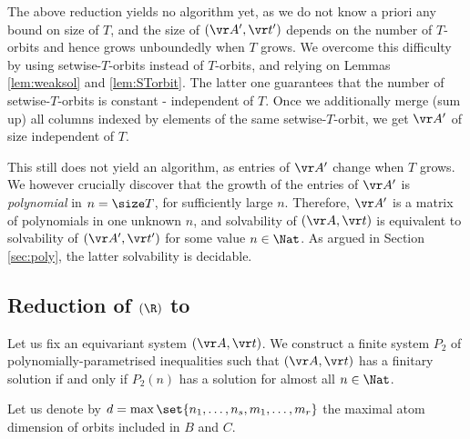 The above reduction yields no algorithm yet, as
we do not know a priori any bound on size of $T$,
and
the size of $(\vr A', \vr t')$ depends on the number of $T$-orbits and hence grows unboundedly when  $T$ grows.
We overcome this difficulty by using setwise-$T$-orbits instead of $T$-orbits, and relying on Lemmas \ref{lem:weaksol}
and \ref{lem:STorbit}.
The latter one guarantees that the number of setwise-$T$-orbits is constant - independent of $T$.
Once we additionally merge (sum up) all columns indexed by elements of the same setwise-$T$-orbit, we get $\vr A'$ of size independent of $T$.


This still does not yield an algorithm, as entries of $\vr A'$ change
when  $T$ grows.
We however crucially discover %
that the growth of the entries of $\vr A'$ is \emph{polynomial}
in $n = \size T$, for sufficiently large $n$.
Therefore, $\vr A'$ is a matrix of polynomials in one unknown $n$, and solvability of $(\vr A, \vr t)$ is equivalent to solvability
of $(\vr A', \vr t')$ for some value $n\in \Nat$.
As argued in Section \ref{sec:poly}, the latter solvability is decidable.



\subsection{Reduction of \finineqsolvname$(\R)$ to \allpolyineqsolvname}
\label{sec:red2poly}

Let us fix an equivariant system $(\vr A, \vr t)$.
We construct a finite system $P_2$ of polynomially-parametrised 
inequalities such that $(\vr A, \vr t)$ has a finitary solution
 if and only if $P_2(n)$ has a solution for almost all $n\in\Nat$.

Let us denote by $d = \max\set{n_1, \ldots, n_s, m_1, \ldots, m_r}$ the maximal atom dimension of
orbits included in $B$ and $C$.
%
%


